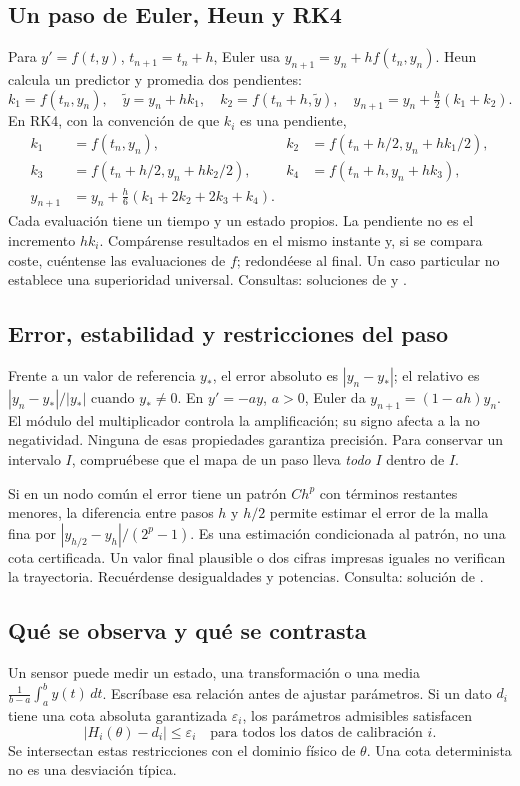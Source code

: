 %
\subsection*{Un paso de Euler, Heun y RK4}
\label{CH03-B01}
Para $y'=f(t,y)$, $t_{n+1}=t_n+h$, Euler usa
$y_{n+1}=y_n+h f(t_n,y_n)$. Heun calcula un predictor y promedia dos
pendientes:
\[
 k_1=f(t_n,y_n),\quad \widetilde y=y_n+hk_1,\quad
 k_2=f(t_n+h,\widetilde y),\quad
 y_{n+1}=y_n+\tfrac h2(k_1+k_2).
\]
En RK4, con la convención de que $k_i$ es una pendiente,
\[
\begin{aligned}
 k_1&=f(t_n,y_n),& k_2&=f(t_n+h/2,y_n+hk_1/2),\\
 k_3&=f(t_n+h/2,y_n+hk_2/2),&
 k_4&=f(t_n+h,y_n+hk_3),\\
 y_{n+1}&=y_n+\tfrac h6(k_1+2k_2+2k_3+k_4).
\end{aligned}
\]
Cada evaluación tiene un tiempo y un estado propios. La pendiente no es
el incremento $hk_i$. Compárense resultados en el mismo instante y,
si se compara coste, cuéntense las evaluaciones de $f$; redondéese al final.
Un caso particular no establece una superioridad universal.
Consultas: soluciones de  y .

%
\subsection*{Error, estabilidad y restricciones del paso}
\label{CH03-B02}
Frente a un valor de referencia $y_*$, el error absoluto es
$|y_n-y_*|$; el relativo es $|y_n-y_*|/|y_*|$ cuando $y_*\ne0$.
En $y'=-ay$, $a>0$, Euler da $y_{n+1}=(1-ah)y_n$.
El módulo del multiplicador controla la amplificación; su signo afecta
a la no negatividad. Ninguna de esas propiedades garantiza precisión.
Para conservar un intervalo $I$, compruébese que el mapa de un paso lleva
\emph{todo} $I$ dentro de $I$.

Si en un nodo común el error tiene un patrón $Ch^p$ con términos restantes
menores, la diferencia entre pasos $h$ y $h/2$ permite estimar el error de
la malla fina por $|y_{h/2}-y_h|/(2^p-1)$. Es una estimación condicionada
al patrón, no una cota certificada. Un valor final plausible o dos cifras
impresas iguales no verifican la trayectoria. Recuérdense desigualdades y
potencias. Consulta: solución de .

%
\subsection*{Qué se observa y qué se contrasta}
\label{CH03-B03}
Un sensor puede medir un estado, una transformación o una media
$\frac1{b-a}\int_a^b y(t)\,dt$. Escríbase esa relación antes de ajustar
parámetros. Si un dato $d_i$ tiene una cota absoluta garantizada
$\varepsilon_i$, los parámetros admisibles satisfacen
\[
 |H_i(\theta)-d_i|\le\varepsilon_i
 \quad\text{para todos los datos de calibración }i.
\]
Se intersectan estas restricciones con el dominio físico de $\theta$.
Una cota determinista no es una desviación típica.

